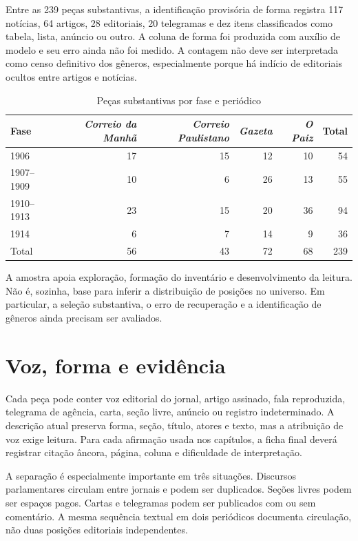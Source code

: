 Entre as 239 peças substantivas, a identificação provisória de forma registra 117 notícias, 64 artigos, 28 editoriais, 20 telegramas e dez itens classificados como tabela, lista, anúncio ou outro. A coluna de forma foi produzida com auxílio de modelo e seu erro ainda não foi medido. A contagem não deve ser interpretada como censo definitivo dos gêneros, especialmente porque há indício de editoriais ocultos entre artigos e notícias.

\begin{table}[ht]
\centering
\caption{Peças substantivas por fase e periódico}
\begin{tabular}{lrrrrr}
\toprule
Fase & \textit{Correio da Manhã} & \textit{Correio Paulistano} & \textit{Gazeta} & \textit{O Paiz} & Total \\
\midrule
1906 & 17 & 15 & 12 & 10 & 54 \\
1907--1909 & 10 & 6 & 26 & 13 & 55 \\
1910--1913 & 23 & 15 & 20 & 36 & 94 \\
1914 & 6 & 7 & 14 & 9 & 36 \\
\midrule
Total & 56 & 43 & 72 & 68 & 239 \\
\bottomrule
\end{tabular}
\end{table}

A amostra apoia exploração, formação do inventário e desenvolvimento da leitura. Não é, sozinha, base para inferir a distribuição de posições no universo. Em particular, a seleção substantiva, o erro de recuperação e a identificação de gêneros ainda precisam ser avaliados.

\section{Voz, forma e evidência}

Cada peça pode conter voz editorial do jornal, artigo assinado, fala reproduzida, telegrama de agência, carta, seção livre, anúncio ou registro indeterminado. A descrição atual preserva forma, seção, título, atores e texto, mas a atribuição de voz exige leitura. Para cada afirmação usada nos capítulos, a ficha final deverá registrar citação âncora, página, coluna e dificuldade de interpretação.

A separação é especialmente importante em três situações. Discursos parlamentares circulam entre jornais e podem ser duplicados. Seções livres podem ser espaços pagos. Cartas e telegramas podem ser publicados com ou sem comentário. A mesma sequência textual em dois periódicos documenta circulação, não duas posições editoriais independentes.

